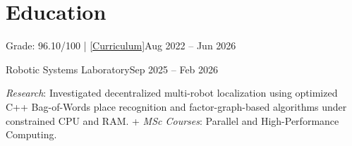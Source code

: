 \section{Education}

\vspace{-2mm}

\resumeHeadingListStart{}
{
  {Grade: 96.10/100 | \href{https://samp.itesm.mx/Programas/VistaPrograma?clave=IRS19\&modoVista=Default\&idioma=EN\&cols=0}{[Curriculum]}}{Aug 2022 -- Jun 2026}

  \vspace{-2mm}


  \vspace{-1mm}
}
\resumeHeadingListEnd{}

\resumeHeadingListStart{}
{
  {Robotic Systems Laboratory}{Sep 2025 -- Feb 2026}

  \vspace{-2mm}

  \item {\small \textit{Research}: Investigated decentralized multi-robot localization using optimized C++ Bag-of-Words place recognition and factor-graph-based algorithms under constrained CPU and RAM. + \textit{MSc Courses}: Parallel and High-Performance Computing.}


}
\resumeHeadingListEnd{}


\vspace{-6mm}
\vspace{-2mm}